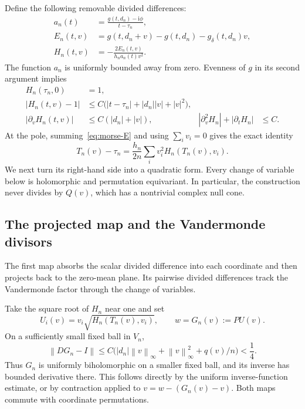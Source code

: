 \documentclass[11pt]{article}
\numberwithin{equation}{section}
\theoremstyle{definition}
\newcommand{\ii}{\mathrm i}
\newcommand{\norm}[1]{\left\lVert#1\right\rVert}
\begin{document}
Define the following removable divided differences:
\begin{align}
 a_n(t)&=\frac{g(t,d_n)-\ii\phi}{t-\tau_n},\label{eq:morse-a}\\
 E_n(t,v)&=g(t,d_n+v)-g(t,d_n)-g_\delta(t,d_n)v,\label{eq:morse-E}\\
 H_n(t,v)&=-\frac{2E_n(t,v)}{h_na_n(t)v^2}.
 \label{eq:morse-H}
\end{align}
The function $a_n$ is uniformly bounded away from zero.  Evenness of $g$
in its second argument implies
\begin{align}
 H_n(\tau_n,0)&=1,\label{eq:morse-H-centre}\\
 |H_n(t,v)-1|&\le C\bigl(|t-\tau_n|+|d_n||v|+|v|^2\bigr),
 \label{eq:morse-H-bound}\\
 |\partial_vH_n(t,v)|&\le C(|d_n|+|v|),&
 |\partial_v^2H_n|+|\partial_tH_n|&\le C.
 \label{eq:morse-H-jets}
\end{align}
At the pole, summing~\eqref{eq:morse-E} and using $\sum_i v_i=0$ gives
the exact identity
\begin{equation}
 \boxed{\displaystyle
 T_n(v)-\tau_n=\frac{h_n}{2n}
 \sum_i v_i^2H_n(T_n(v),v_i).}
 \label{eq:morse-energy}
\end{equation}
We next turn its right-hand side into a quadratic form.  Every change of
variable below is holomorphic and permutation equivariant.  In particular,
the construction never divides by $Q(v)$, which has a nontrivial complex
null cone.

\subsection{The projected map and the Vandermonde divisors}

The first map absorbs the scalar divided difference into each
coordinate and then projects back to the zero-mean plane. Its pairwise
divided differences track the Vandermonde factor through the change
of variables.

Take the square root of $H_n$ near one and set
\begin{equation}
 U_i(v)=v_i\sqrt{H_n(T_n(v),v_i)},\qquad
 w=G_n(v):=PU(v).
 \label{eq:morse-first-map}
\end{equation}
On a sufficiently small fixed ball in $V_n$,
\begin{equation}
 \norm{DG_n-I}
 \le C\bigl(|d_n|\norm v_\infty+\norm v_\infty^2+q(v)/n\bigr)
 <\frac14.
 \label{eq:morse-first-inverse}
\end{equation}
Thus $G_n$ is uniformly biholomorphic on a smaller fixed ball, and its
inverse has bounded derivative there.  This follows directly by the
uniform inverse-function estimate, or by contraction applied to
$v=w-(G_n(v)-v)$.  Both maps commute with coordinate permutations.
\end{document}
